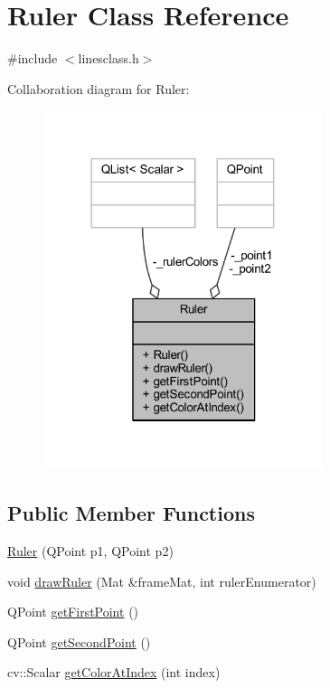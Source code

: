 \hypertarget{class_ruler}{}\section{Ruler Class Reference}
\label{class_ruler}


{\ttfamily \#include $<$linesclass.\+h$>$}



Collaboration diagram for Ruler\+:
\nopagebreak
\begin{figure}[H]
\begin{center}
\leavevmode
\includegraphics[width=232pt]{class_ruler__coll__graph}
\end{center}
\end{figure}
\subsection*{Public Member Functions}
\begin{DoxyCompactItemize}
\item 
\mbox{\hyperlink{class_ruler_a9e0723f35460c16a91ee88278982e3e9}{Ruler}} (Q\+Point p1, Q\+Point p2)
\item 
void \mbox{\hyperlink{class_ruler_aa86402b06c3d92112d49ca41e65b1897}{draw\+Ruler}} (Mat \&frame\+Mat, int ruler\+Enumerator)
\item 
Q\+Point \mbox{\hyperlink{class_ruler_acd500bb44e0a7f79e881ae15e0a6a03a}{get\+First\+Point}} ()
\item 
Q\+Point \mbox{\hyperlink{class_ruler_a8a39371560dd77a617496fffddc47966}{get\+Second\+Point}} ()
\item 
cv\+::\+Scalar \mbox{\hyperlink{class_ruler_ae7e524a583b89c5905d1aee2d6ecb85d}{get\+Color\+At\+Index}} (int index)
\end{DoxyCompactItemize}
